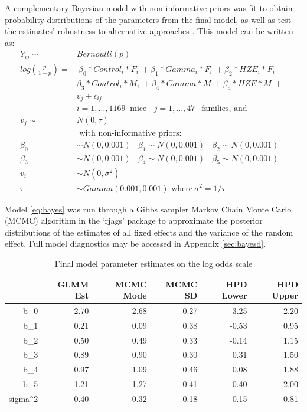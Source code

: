 \documentclass[12pt]{article}
\begin{document}
A complementary Bayesian model with non-informative priors was fit to obtain probability distributions of the parameters from the final model, as well as test the estimates' robustness to alternative approaches \citep{BDA}. This model can be written as:\\
\begin{equation}
\begin{aligned}
Y_{ij} \sim &Bernoulli(p)\\
log(\frac{p}{1-p}) = &\ \beta_0*Control_i*F_i\ +\beta_1*Gamma_i*F_i\ + \beta_2*HZE_i*F_i\ + \\ &\beta_3*Control_i*M_i\ +\beta_4*Gamma*M\ + \beta_5*HZE*M\ + \\
&v_{j} + \epsilon_{ij}\\
&i = 1, ..., 1169\ \mbox{ mice}\ \ \ \ j = 1,...,47\ \ \mbox{ families, and} \\
v_j \sim\ &N(0, \tau)
\\
&\mbox{ with non-informative priors:}\\
\beta_0 &\sim N(0, 0.001)\ \ \ \ \beta_1 \sim N(0, 0.001)\ \ \ \ \beta_2 \sim N(0, 0.001)\\
\beta_3 &\sim N(0, 0.001)\ \ \ \ \beta_4 \sim N(0, 0.001)\ \ \ \ \beta_5 \sim N(0, 0.001)\\
v_i &\sim N(0, \sigma^2)\\
\tau &\sim Gamma(0.001, 0.001) \mbox{ where}\ \sigma^2 = 1/\tau 
\end{aligned}
\label{eq:bayes}
\end{equation}

Model \eqref{eq:bayes} was run through a Gibbs sampler Markov Chain Monte Carlo (MCMC) algorithm in the `rjags' package \citep{R-rjags} to approximate the posterior distributions of the estimates of all fixed effects and the variance of the random effect. Full model diagnostics may be accessed in Appendix \ref{sec:bayesd}.

\begin{table}[H]
\centering
\begingroup\fontsize{9pt}{10pt}\selectfont
\begin{tabular}{rrrrrr}
  \toprule
 & GLMM Est & MCMC Mode & MCMC SD & HPD Lower & HPD Upper \\ 
  \midrule
b\_0 & -2.70 & -2.68 & 0.27 & -3.25 & -2.20 \\ 
  b\_1 & 0.21 & 0.09 & 0.38 & -0.53 & 0.95 \\ 
  b\_2 & 0.50 & 0.49 & 0.33 & -0.14 & 1.15 \\ 
  b\_3 & 0.89 & 0.90 & 0.30 & 0.31 & 1.50 \\ 
  b\_4 & 0.97 & 1.09 & 0.46 & 0.08 & 1.88 \\ 
  b\_5 & 1.21 & 1.27 & 0.41 & 0.40 & 2.00 \\ 
  sigma\verb|^|2 & 0.40 & 0.32 & 0.18 & 0.15 & 0.81 \\ 
   \bottomrule
\end{tabular}
\endgroup
\caption{Final model parameter estimates on the log odds scale} 
\label{tab:esttab}
\end{table}
\end{document}

